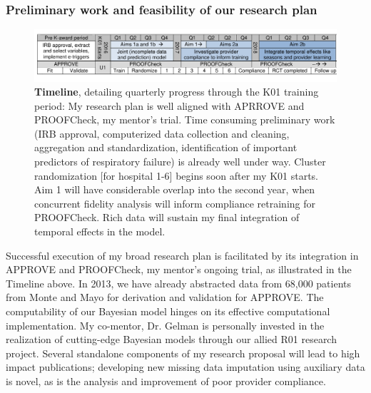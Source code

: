 \documentclass[11pt,notitlepage]{article}
\begin{document}
\subsubsection*{Preliminary work and feasibility of our research plan }

\begin{figure}[h]
 \vspace{-20pt}
 \centering
   \includegraphics[scale=1]{Figures/Timeline.pdf}  
 \vspace{-30pt}
 \caption*{\footnotesize \textbf{Timeline}, detailing quarterly progress through the K01 training period: My research plan is well aligned with APRROVE and PROOFCheck, my mentor's trial. Time consuming preliminary work (IRB approval, computerized data collection and cleaning, aggregation and standardization, identification of important predictors of respiratory failure) is already well under way. Cluster randomization [for hospital 1-6] begins soon after my K01 starts. Aim 1 will have considerable overlap into the second year, when concurrent fidelity analysis will inform compliance retraining for PROOFCheck. Rich data will sustain my final integration of temporal effects in the model.}
  \vspace{-10pt}
  \label{fig:Timeline}
 \end{figure}
 
Successful execution of my broad research plan is facilitated by its integration in APPROVE and PROOFCheck, my mentor's ongoing trial, as illustrated in the Timeline above. In 2013, we have already abstracted data from 68,000 patients from Monte and Mayo for derivation and validation for APPROVE. The computability of our Bayesian model hinges on its effective computational implementation. My co-mentor, Dr. Gelman is personally invested in the realization of cutting-edge Bayesian models through our allied R01 research project. Several standalone components of my research proposal will lead to high impact publications; developing new missing data imputation using auxiliary data is novel, as is the analysis and improvement of poor provider compliance. 
\end{document}
